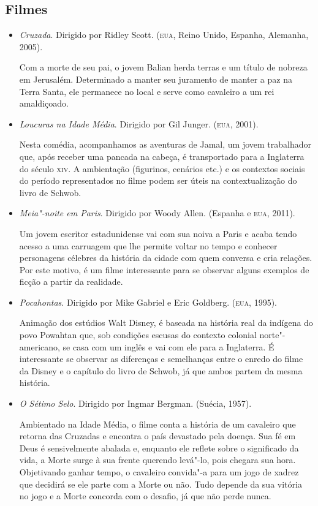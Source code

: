 \documentclass[12pt]{extarticle}
\begin{document}
\subsection{Filmes}
\begin{itemize}

	\item\textit{Cruzada}. Dirigido por Ridley Scott. (\textsc{eua}, Reino Unido, Espanha,
	Alemanha, 2005).

	Com a morte de seu pai, o jovem Balian herda terras e um título de
	nobreza em Jerusalém. Determinado a manter seu juramento de manter a paz
	na Terra Santa, ele permanece no local e serve como cavaleiro a um rei
	amaldiçoado.

	\item\textit{Loucuras na Idade Média}. Dirigido por Gil Junger. (\textsc{eua}, 2001).

	Nesta comédia, acompanhamos as aventuras de Jamal, um jovem trabalhador que, após receber
	uma pancada na cabeça, é transportado para a Inglaterra do século \textsc{xiv}.
	A ambientação (figurinos, cenários etc.) e os contextos sociais do período representados no filme
	podem ser úteis na contextualização do livro de Schwob.


	\item\textit{Meia"-noite em Paris}. Dirigido por Woody Allen. (Espanha e \textsc{eua}, 2011).

	Um jovem escritor estadunidense vai com sua noiva a Paris e acaba tendo acesso
	a uma carruagem que lhe permite voltar no tempo e conhecer personagens célebres da 
	história da cidade com quem conversa e cria relações. Por este motivo, é um filme 
	interessante para se observar alguns exemplos de ficção a partir da realidade.

	\item\textit{Pocahontas}. Dirigido por Mike Gabriel e Eric Goldberg. (\textsc{eua}, 1995).

	Animação dos estúdios Walt Disney, é baseada na história real da indígena do povo Powahtan
	que, sob condições escusas do contexto colonial norte"-americano, se casa com um inglês
	e vai com ele para a Inglaterra. É interessante se observar as diferenças e 
	semelhanças entre o enredo do filme da Disney e o capítulo do livro de Schwob,
	já que ambos partem da mesma história.

	\item\textit{O Sétimo Selo}. Dirigido por Ingmar Bergman. (Suécia, 1957).

	Ambientado na Idade Média, o filme conta a história de um cavaleiro que retorna 
	das Cruzadas e encontra o país devastado pela doença. Sua fé em Deus é sensivelmente 
	abalada e, enquanto ele reflete sobre o significado da vida, a Morte surge à sua 
	frente querendo levá"-lo, pois chegara sua hora. Objetivando ganhar tempo, o cavaleiro 
	convida"-a para um jogo de xadrez que decidirá se ele parte com a Morte ou não. 
	Tudo depende da sua vitória no jogo e a Morte concorda com o desafio, já que não perde nunca.

\end{itemize}
\end{document}
